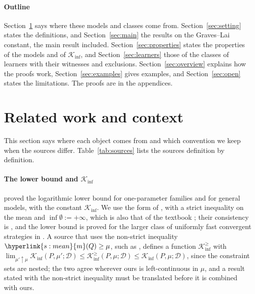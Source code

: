 \documentclass[11pt]{article}
\newcommand{\sy}[2]{{\hyperlink{#1}{#2}}}
\newcommand{\mean}{\sy{s:mean}{m}}
\begin{document}
\paragraph{Outline} Section~\ref{sec:related} says where these models and classes come from.
Section~\ref{sec:setting} states the definitions, and Section~\ref{sec:main} the results on the
Graves--Lai constant, the main result included. Section~\ref{sec:properties} states the
properties of the models and of $\mathcal K_{\inf}$, and Section~\ref{sec:learners} those of the
classes of learners with their witnesses and exclusions. Section~\ref{sec:overview} explains how
the proofs work, Section~\ref{sec:examples} gives examples, and Section~\ref{sec:open} states the
limitations. The proofs are in the appendices.

\section{Related work and context}\label{sec:related}

This section says where each object comes from and which convention we keep when the sources
differ. Table~\ref{tab:sources} lists the sources definition by definition.

\paragraph{The lower bound and $\mathcal K_{\inf}$} \citet{LR85} proved the logarithmic lower bound
for one-parameter families and \citet{BK96} for general models, with the constant
$\mathcal K_{\inf}$. We use the form of \citet[Section~1.2]{GMS19}, with a strict inequality on
the mean and $\inf\emptyset:=+\infty$, which is also that of the textbook
\citet[Theorem~16.2]{LS}; their consistency is \citet[Definition~16.1]{LS}, and the lower bound is
proved for the larger class of uniformly fast convergent strategies in
\citet[Definition~1 and Theorem~1]{GMS19}. A source that uses the non-strict inequality $\mean(Q)\ge\mu$, such as
\citet[Section~2]{AJK21}, defines a function $\mathcal K^{\ge}_{\inf}$ with
$\lim_{\mu'\uparrow\mu}\mathcal K_{\inf}(P,\mu';\mathcal D)\le\mathcal K^{\ge}_{\inf}(P,\mu;\mathcal D)\le\mathcal K_{\inf}(P,\mu;\mathcal D)$,
since the constraint sets are nested; the two agree wherever ours is left-continuous in $\mu$, and a
result stated with the non-strict inequality must be translated before it is combined with ours.
\end{document}
